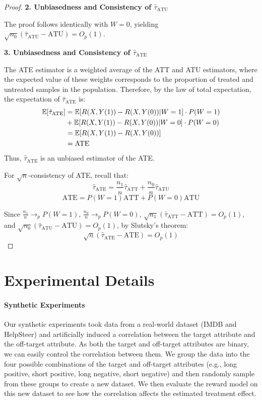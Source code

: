 \documentclass{article}
\begin{document}
\begin{proof}
  \textbf{2. Unbiasedness and Consistency of $\hat{\tau}_{\text{ATU}}$}
  
  The proof follows identically with $W = 0$, yielding $\sqrt{n_0}(\hat{\tau}_{\text{ATU}} - \text{ATU}) = O_p(1)$.
  
  \textbf{3. Unbiasedness and Consistency of $\hat{\tau}_{\text{ATE}}$}
  
  The ATE estimator is a weighted average of the ATT and ATU estimators, where the expected value of these weights corresponds to the proportion of treated and untreated samples in the population. Therefore, by the law of total expectation, the expectation of $\hat{\tau}_{\text{ATE}}$ is:
  \begin{align*}
  \mathbb{E}[\hat{\tau}_{\text{ATE}}] &= \mathbb{E}[R(X, Y(1)) - R(X, Y(0)) | W = 1] \cdot P(W = 1) \\
  &+ \mathbb{E}[R(X, Y(1)) - R(X, Y(0)) | W = 0] \cdot P(W = 0) \\
  &= \mathbb{E}[R(X, Y(1)) - R(X, Y(0))] \\
  &= \text{ATE}
  \end{align*}
  Thus, $\hat{\tau}_{\text{ATE}}$ is an unbiased estimator of the ATE.

  For $\sqrt{n}$-consistency of ATE, recall that:
\[\hat{\tau}_{\text{ATE}} = \frac{n_1}{n}\hat{\tau}_{\text{ATT}} + \frac{n_0}{n}\hat{\tau}_{\text{ATU}}\]
\[\text{ATE} = P(W=1)\text{ATT} + P(W=0)\text{ATU}\]

  Since $\frac{n_1}{n} \to_p P(W=1)$, $\frac{n_0}{n} \to_p P(W=0)$, $\sqrt{n_1}(\hat{\tau}_{\text{ATT}} - \text{ATT}) = O_p(1)$, and $\sqrt{n_0}(\hat{\tau}_{\text{ATU}} - \text{ATU}) = O_p(1)$, by Slutsky's theorem:
  \[\sqrt{n}(\hat{\tau}_{\text{ATE}} - \text{ATE}) = O_p(1)\]
\end{proof}

\section{Experimental Details}
\label{sec:experiment-details}

\paragraph{Synthetic Experiments} 
\label{sec:synthetic-details}
Our synthetic experiments took data from a real-world dataset (IMDB and HelpSteer) and artificially induced a correlation between the target attribute and the off-target attribute. As both the target and off-target attributes are binary, we can easily control the correlation between them. We group the data into the four possible combinations of the target and off-target attributes (e.g., long positive, short positive, long negative, short negative) and then randomly sample from these groups to create a new dataset. We then evaluate the reward model on this new dataset to see how the correlation affects the estimated treatment effect.
\end{document}

